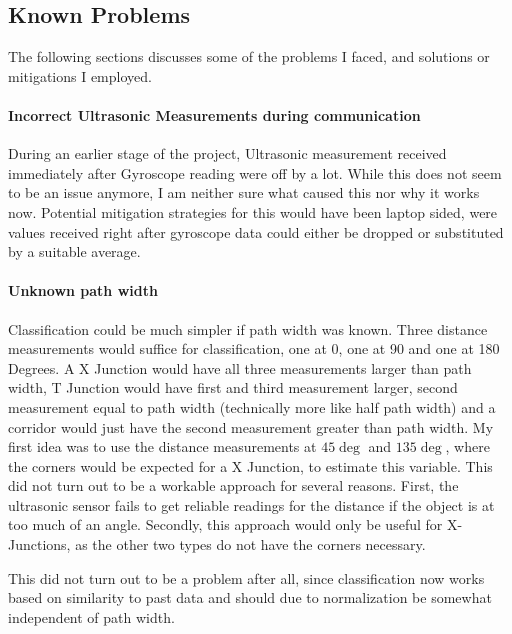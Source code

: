 \subsection{Known Problems}

The following sections discusses some of the problems I faced, and solutions or mitigations I employed.


\paragraph{Incorrect Ultrasonic Measurements during \IIC communication}
During an earlier stage of the project, Ultrasonic measurement received immediately after Gyroscope reading were off
by a lot. 
While this does not seem to be an issue anymore, I am neither sure what caused this nor why it works now. 
Potential mitigation strategies for this would have been laptop sided, were values received right after gyroscope data
could either be dropped or substituted by a suitable average.


\paragraph{Unknown path width}
Classification could be much simpler if path width was known. Three distance measurements would suffice for classification, one at 0, one at 90 and one at 180 Degrees.
A X Junction would have all three measurements larger than path width,
T Junction would have first and third measurement larger, second measurement equal to path width (technically more like half path width) and
a corridor would just have the second measurement greater than path width.
My first idea was to use the distance measurements at $45\deg$ and $135\deg$, where the corners would be expected for a X Junction, to estimate this variable.
This did not turn out to be a workable approach for several reasons.
First, the ultrasonic sensor fails to get reliable readings for the distance if the object is at too much of an angle.
Secondly, this approach would only be useful for X-Junctions, as the other two types do not have the corners necessary.

This did not turn out to be a problem after all, since classification now works based on similarity to past data and should due to normalization be somewhat independent of path width.
